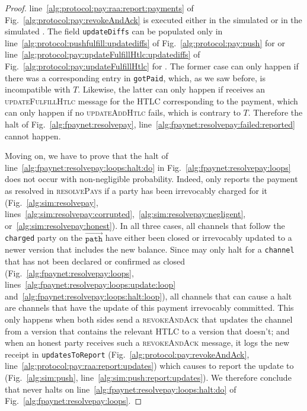 \begin{proof}
  line~\ref{alg:protocol:pay:raa:report:payments} of
  Fig.~\ref{alg:protocol:pay:revokeAndAck} is executed either in the simulated
  \alice{} or in the simulated \bob. The field \texttt{updateDiffs} can be
  populated only in line~\ref{alg:protocol:pushfulfill:updatediffs} of
  Fig.~\ref{alg:protocol:pay:push} for \alice{} or
  line~\ref{alg:protocol:pay:updateFulfillHtlc:updatediffs} of
  Fig.~\ref{alg:protocol:pay:updateFulfillHtlc} for \bob. The former case can
  only happen if there was a corresponding entry in \texttt{gotPaid}, which, as
  we saw before, is incompatible with $T$. Likewise, the latter can only happen
  if \alice{} receives an \textsc{updateFulfillHtlc} message for the HTLC
  corresponding to the payment, which can only happen if no
  \textsc{updateAddHtlc} fails, which is contrary to $T$. Therefore the halt of
  Fig.~\ref{alg:fpaynet:resolvepay},
  line~\ref{alg:fpaynet:resolvepay:failed:reported} cannot happen.

  Moving on, we have to prove that the halt of
  line~\ref{alg:fpaynet:resolvepay:loops:halt:do} in
  Fig.~\ref{alg:fpaynet:resolvepay:loops} does not occur with non-negligible
  probability. Indeed, \simulator{} only reports the payment as resolved in
  \textsc{resolvePays} if a party has been irrevocably charged for it
  (Fig.~\ref{alg:sim:resolvepay},
  lines~\ref{alg:sim:resolvepay:corrupted},~\ref{alg:sim:resolvepay:negligent},
  or~\ref{alg:sim:resolvepay:honest}). In all three cases, all channels that
  follow the \texttt{charged} party on the $\overrightarrow{\mathtt{path}}$ have
  either been closed or irrevocably updated to a newer version that includes the
  new balance. Since \fpaynet{} may only halt for a \texttt{channel} that has
  not been declared or confirmed as closed
  (Fig.~\ref{alg:fpaynet:resolvepay:loops},
  lines~\ref{alg:fpaynet:resolvepay:loops:update:loop}
  and~\ref{alg:fpaynet:resolvepay:loops:halt:loop}), all channels that can cause
  a halt are channels that have the update of this payment irrevocably
  committed. This only happens when both sides send a \textsc{revokeAndAck} that
  updates the channel from a version that contains the relevant HTLC to a
  version that doesn't; and when an honest party receives such a
  \textsc{revokeAndAck} message, it logs the new receipt in
  \texttt{updatesToReport} (Fig.~\ref{alg:protocol:pay:revokeAndAck},
  line~\ref{alg:protocol:pay:raa:report:updates}) which causes \simulator{} to
  report the update to \fpaynet{} (Fig.~\ref{alg:sim:push},
  line~\ref{alg:sim:push:report:updates}). We therefore conclude that \fpaynet{}
  never halts on line~\ref{alg:fpaynet:resolvepay:loops:halt:do} of
  Fig.~\ref{alg:fpaynet:resolvepay:loops}.


\end{proof}
